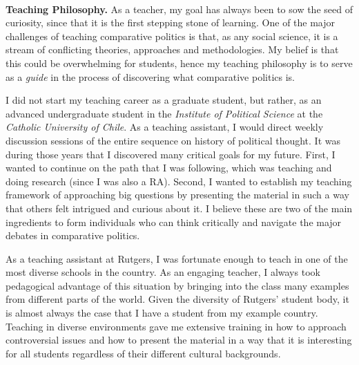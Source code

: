 \documentclass[10pt,stdletter,dateno,sigleft]{newlfm} %
\begin{document}
\begin{newlfm}




\vspace{-2cm}{\bf \huge Teaching Statement}\\

{\bf Teaching Philosophy.} As a teacher, my goal has always been to sow the seed of curiosity, since that it is the first stepping stone of learning. One of the major challenges of teaching comparative politics is that, as any social science, it is a stream of conflicting theories, approaches and methodologies. My belief is that this could be overwhelming for students, hence my teaching philosophy is to serve as a \emph{guide} in the process of discovering what comparative politics is.

I did not start my teaching career as a graduate student, but rather, as an advanced undergraduate student in the \emph{Institute of Political Science} at the \emph{Catholic University of Chile}. As a teaching assistant, I would direct weekly discussion sessions of the entire sequence on history of political thought. It was during those years that I discovered many critical goals for my future. First, I wanted to continue on the path that I was following, which was teaching and doing research (since I was also a RA). Second, I wanted to establish my teaching framework of approaching big questions by presenting the material in such a way that others felt intrigued and curious about it. I believe these are two of the main ingredients to form individuals who can think critically and navigate the major debates in comparative politics. 

As a teaching assistant at Rutgers, I was fortunate enough to teach in one of the most diverse schools in the country. As an engaging teacher, I always took pedagogical advantage of this situation by bringing into the class many examples from different parts of the world. Given the diversity of Rutgers' student body, it is almost always the case that I have a student from my example country. Teaching in diverse environments gave me extensive training in how to approach controversial issues and how to present the material in a way that it is interesting for all students regardless of their different cultural backgrounds. 


\end{newlfm}
\end{document}

